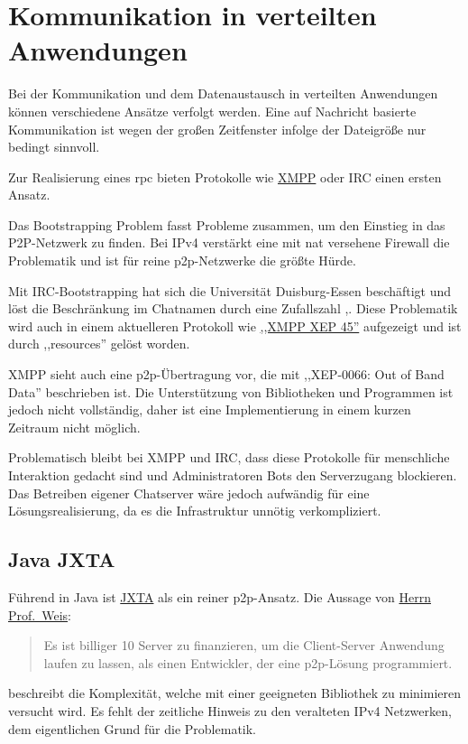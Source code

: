\documentclass[oneside, ngerman, toc=bibliography,bibliography=totoc,listof=entryprefix, open=right,numbers=noenddot,fontsize=12pt]{scrbook}
\begin{document}
\section{Kommunikation in verteilten Anwendungen}\label{sec:comm}
Bei der Kommunikation und  dem Datenaustausch in verteilten Anwendungen können verschiedene Ansätze verfolgt werden. Eine auf Nachricht basierte Kommunikation ist wegen der großen Zeitfenster infolge der Dateigröße nur bedingt sinnvoll.

Zur Realisierung eines \acrfull{rpc} bieten Protokolle wie \href{http://xmpp.org/}{XMPP}  oder IRC einen ersten Ansatz.

Das Bootstrapping Problem fasst Probleme zusammen, um den Einstieg in das P2P-Netzwerk zu finden. Bei IPv4 verstärkt eine mit \acrfull{nat} versehene Firewall die Problematik und ist für reine \acrshort{p2p}-Netzwerke die größte Hürde.

Mit IRC-Bootstrapping hat sich die Universität Duisburg-Essen beschäftigt und löst die Beschränkung im Chatnamen durch eine Zufallszahl \cite{5159226},\cite{RFC2812}. Diese Problematik wird auch in einem aktuelleren Protokoll wie \href{http://xmpp.org/extensions/xep-0045.html\#enter-conflict}{,,XMPP XEP 45''} aufgezeigt und ist durch ,,resources'' gelöst worden.

XMPP sieht auch eine \acrshort{p2p}-Übertragung vor, die mit ,,XEP-0066: Out of Band Data''  beschrieben ist. Die Unterstützung von Bibliotheken und Programmen ist jedoch nicht vollständig, daher ist eine Implementierung in einem kurzen Zeitraum nicht möglich.

Problematisch bleibt bei XMPP und IRC, dass diese Protokolle für menschliche Interaktion gedacht sind und Administratoren Bots den Serverzugang blockieren. Das Betreiben eigener Chatserver wäre jedoch aufwändig für eine Lösungsrealisierung, da es die Infrastruktur unnötig verkompliziert.

 
\subsection{Java JXTA}
Führend in Java ist \href{https://jxta.kenai.com/}{{JXTA}} als ein reiner \acrshort{p2p}-Ansatz. Die Aussage von \href{http://www.vs.uni-due.de/}{Herrn Prof.\ Weis}:

\begin{quote}
Es ist billiger 10 Server zu finanzieren, um die Client-Server Anwendung laufen zu lassen, als einen Entwickler, der eine \acrshort{p2p}-Lösung programmiert.
\end{quote}
beschreibt die Komplexität, welche mit einer geeigneten Bibliothek zu minimieren versucht wird.
Es fehlt der zeitliche Hinweis zu den veralteten IPv4 Netzwerken, dem eigentlichen Grund für die Problematik.
\end{document}
